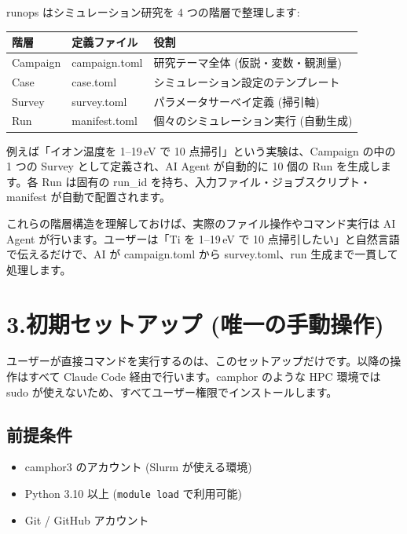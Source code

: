 \documentclass[a4paper,11pt]{article}
\newenvironment{infobox}{%
  \medskip\noindent
  \fboxrule=0.5pt\fboxsep=8pt
  \fcolorbox{infoframe}{infobg}\bgroup\minipage{\dimexpr\linewidth-2\fboxsep-2\fboxrule}
}{%
  \endminipage\egroup\medskip
}
\begin{document}
runops はシミュレーション研究を 4 つの階層で整理します:

\begin{center}
\begin{tabular}{lll}
\toprule
\textbf{階層} & \textbf{定義ファイル} & \textbf{役割} \\
\midrule
Campaign & campaign.toml & 研究テーマ全体 (仮説・変数・観測量) \\
Case & case.toml & シミュレーション設定のテンプレート \\
Survey & survey.toml & パラメータサーベイ定義 (掃引軸) \\
Run & manifest.toml & 個々のシミュレーション実行 (自動生成) \\
\bottomrule
\end{tabular}
\end{center}

例えば「イオン温度を 1--19\,eV で 10 点掃引」という実験は、Campaign の中の 1 つの Survey として定義され、AI Agent が自動的に 10 個の Run を生成します。各 Run は固有の run\_id を持ち、入力ファイル・ジョブスクリプト・manifest が自動で配置されます。

\begin{infobox}
これらの階層構造を理解しておけば、実際のファイル操作やコマンド実行は AI Agent が行います。ユーザーは「Ti を 1--19\,eV で 10 点掃引したい」と自然言語で伝えるだけで、AI が campaign.toml から survey.toml、run 生成まで一貫して処理します。
\end{infobox}

\section*{\color{darkblue} 3.\quad 初期セットアップ (唯一の手動操作)}

ユーザーが直接コマンドを実行するのは、このセットアップだけです。以降の操作はすべて Claude Code 経由で行います。camphor のような HPC 環境では sudo が使えないため、すべてユーザー権限でインストールします。

\subsection*{\color{accent} 前提条件}

\begin{itemize}[nosep]
  \item camphor3 のアカウント (Slurm が使える環境)
  \item Python 3.10 以上 (\texttt{module load} で利用可能)
  \item Git / GitHub アカウント
\end{itemize}
\end{document}
